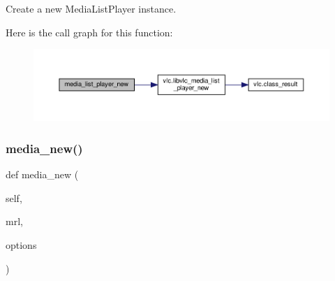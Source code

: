 \begin{DoxyVerb}Create a new MediaListPlayer instance.
\end{DoxyVerb}
 Here is the call graph for this function\+:
\nopagebreak
\begin{figure}[H]
\begin{center}
\leavevmode
\includegraphics[width=350pt]{classvlc_1_1_instance_af64a515387ea79e6f6f97621283c4a33_cgraph}
\end{center}
\end{figure}
\mbox{\label{classvlc_1_1_instance_ac9af019663459bddfa7376f3692754d9}} 
\subsubsection{\texorpdfstring{media\+\_\+new()}{media\_new()}}
{\footnotesize\ttfamily def media\+\_\+new (\begin{DoxyParamCaption}\item[{}]{self,  }\item[{}]{mrl,  }\item[{}]{options }\end{DoxyParamCaption})}

